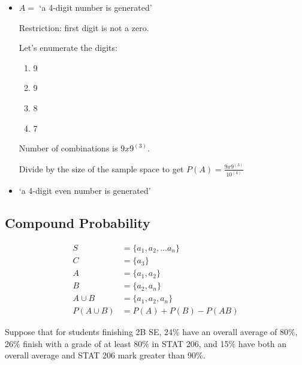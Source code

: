                    \begin{itemize}
                        \item $A=$ `a 4-digit number is generated'

                            Restriction: first digit is not a zero.

                            Let's enumerate the digits:
                            \begin{enumerate}
                                \item 9
                                \item 9
                                \item 8
                                \item 7
                            \end{enumerate}
                            Number of combinations is $9 x 9^{(3)}$.

                            Divide by the size of the sample space to get $P(A) = \frac{9 x 9^{(3)}}{10^{(4)}}$
                        \item `a 4-digit even number is generated'
                    \end{itemize}
                \subsection{Compound Probability} %
                \label{sub:compound_probability}
                    \begin{align*}
                        S           &= \{ a_1, a_2, ... a_n \} \\
                        C           &= \{ a_3 \} \\
                        A           &= \{ a_1, a_2 \} \\
                        B           &= \{ a_2, a_n \} \\
                        A \cup B    &= \{ a_1, a_2, a_n \} \\
                        P(A \cup B) &= P(A) + P(B) - P(AB)
                    \end{align*}

                    \ex
                    Suppose that for students finishing 2B SE, 24\% have an overall average of 80\%, 26\% finish with a grade of at least 80\% in STAT 206, and 15\% have both an overall average and STAT 206 mark greater than 90\%.

